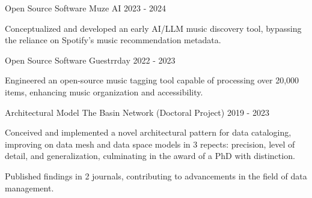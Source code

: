 

\begin{cventries}


  \cventry
    {Open Source Software} %
    {Muze AI} %
    {2023 - 2024} %
    {} %
    {
          \begin{cvitems} %
	        \item {Conceptualized and developed an early AI/LLM music discovery tool, bypassing the reliance on Spotify's music recommendation metadata.}
	      \end{cvitems}
    }



  \cventry
    {Open Source Software} %
    {Guestrrday} %
    {2022 - 2023} %
    {} %
    {
          \begin{cvitems} %
	        \item {Engineered an open-source music tagging tool capable of processing over 20,000 items, enhancing music organization and accessibility.}
	      \end{cvitems}
    }




  \cventry
    {Architectural Model} %
    {The Basin Network (Doctoral Project)} %
    {2019 - 2023} %
    {} %
    {
          \begin{cvitems} %
			\item {Conceived and implemented a novel architectural pattern for data cataloging, improving on data mesh and data space models in 3 repects: precision, level of detail, and generalization, culminating in the award of a PhD with distinction.}
			\item {Published findings in 2 journals, contributing to advancements in the field of data management.}
	      \end{cvitems}
    }



\end{cventries}

